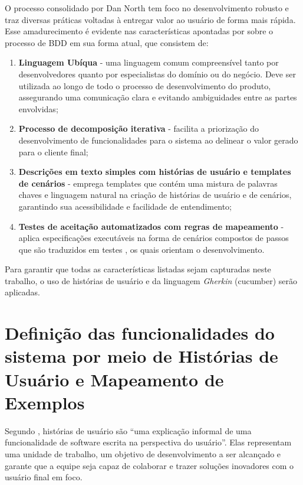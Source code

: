 O processo consolidado por Dan North tem foco no desenvolvimento robusto e traz diversas práticas voltadas à entregar valor ao usuário de forma mais rápida. Esse 
amadurecimento é evidente nas características apontadas por  sobre o processo de BDD em sua forma atual, que consistem de:

\begin{enumerate}
	\item \textbf{Linguagem Ubíqua} - uma linguagem comum compreensível tanto por desenvolvedores quanto por especialistas do domínio ou do negócio. Deve ser utilizada 
	ao longo de todo o processo de desenvolvimento do produto, assegurando uma comunicação clara e evitando ambiguidades entre as partes envolvidas;
	\item \textbf{Processo de decomposição iterativa} - facilita a priorização do desenvolvimento de funcionalidades para o sistema ao delinear o valor gerado para o cliente final;
	\item \textbf{Descrições em texto simples com histórias de usuário e templates de cenários} - emprega templates que contém uma mistura de palavras chaves e linguagem natural na 
	criação de histórias de usuário e de cenários, garantindo sua acessibilidade e facilidade de entendimento;
	\item \textbf{Testes de aceitação automatizados com regras de mapeamento} - aplica especificações executáveis na forma de cenários compostos de passos que são traduzidos em testes
	, os quais orientam o desenvolvimento.
\end{enumerate}

Para garantir que todas as características listadas sejam capturadas neste trabalho, o uso de histórias de usuário \cite{atlassianUserStories} e da 
linguagem \textit{Gherkin} (cucumber) \cite{cucumberHistory} serão aplicadas.


\section{\textbf{Definição das funcionalidades do sistema por meio de Histórias de Usuário e Mapeamento de Exemplos}}

Segundo , histórias de usuário são “uma explicação informal de uma funcionalidade de software escrita na perspectiva do usuário”. Elas 
representam uma unidade de trabalho, um objetivo de desenvolvimento a ser alcançado e garante que a equipe seja capaz de colaborar e trazer soluções inovadores 
com o usuário final em foco.

